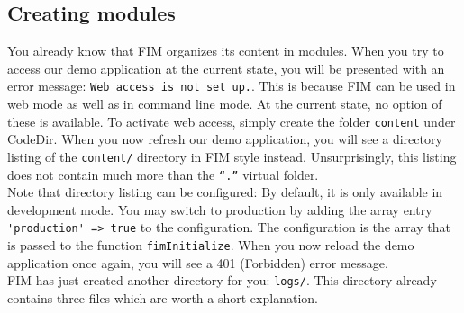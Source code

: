 \documentclass{scrartcl}
\begin{document}
   \subsection{Creating modules}
      You already know that FIM organizes its content in modules. When you try to access our demo application at the current state, you will be presented with an error message: \texttt{Web access is not set up.}. This is because FIM can be used in web mode as well as in command line mode. At the current state, no option of these is available. To activate web access, simply create the folder \texttt{content} under CodeDir. When you now refresh our demo application, you will see a directory listing of the \texttt{content/} directory in FIM style instead. Unsurprisingly, this listing does not contain much more than the \texttt{``.''} virtual folder. \\
      Note that directory listing can be configured: By default, it is only available in development mode. You may switch to production by adding the array entry \lstinline!'production' => true! to the configuration. The configuration is the array that is passed to the function \lstinline!fimInitialize!. When you now reload the demo application once again, you will see a 401 (Forbidden) error message. \\
      FIM has just created another directory for you: \texttt{logs/}. This directory already contains three files which are worth a short explanation.
\end{document}
